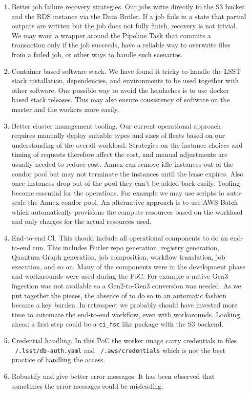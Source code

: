 \begin{enumerate}
\item Better job failure recovery strategies.
Our jobs write directly to the S3 bucket and the RDS instance via the Data Butler.
If a job fails in a state that partial outputs are written but the job does not fully finish, recovery is not trivial.
We may want a wrapper around the Pipeline Task that commits a transaction only if the job succeeds, have a reliable way to overwrite files from a failed job, or other ways to handle such scenarios.
\item Container based software stack.
We have found it tricky to handle the LSST stack installation, dependencies, and environments to be used together with other software.
One possible way to avoid the headaches is to use docker based stack releases.
This may also ensure consistency of software on the master and the workers more easily.
\item Better cluster management tooling.
Our current operational approach requires manually deploy suitable types and sizes of fleets based on our understanding of the overall workload.
Strategies on the instance choices and timing of requests therefore affect the cost, and manual adjustments are usually needed to reduce cost.
Annex can remove idle instances out of the condor pool but may not terminate the instances until the lease expires.
Also once instances drop out of the pool they can't be added back easily.
Tooling become essential for the operations.
For example we may use scripts to auto-scale the Annex condor pool.
An alternative approach is to use AWS Batch which automatically provisions the compute resources based on the workload and only charges for the actual resources used.
\item End-to-end CI.
This should include all operational components to do an end-to-end run.
This includes Butler repo generation, registry generation, Quantum Graph generation, job composition, workflow translation, job execution, and so on.
Many of the components were in the development phase and workarounds were used during the PoC.
For example a native Gen3 ingestion was not available so a Gen2-to-Gen3 conversion was needed.
As we put together the pieces, the absence of to do so in an automatic fashion became a key burden.
In retrospect we probably should have invested more time to automate the end-to-end workflow, even with workarounds.
Looking ahead a first step could be a \texttt{ci\_hsc} like package with the S3 backend.
\item Credential handling.
In this PoC the worker image carry credentials in files \texttt{~/.lsst/db-auth.yaml} and \texttt{~/.aws/credentials} which is not the best practice of handling the access.
\item Robustify and give better error messages.
It has been observed that sometimes the error messages could be misleading.

\end{enumerate}
